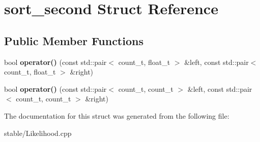 \hypertarget{structsort__second}{\section{sort\-\_\-second Struct Reference}
\label{structsort__second}
}
\subsection*{Public Member Functions}
\begin{DoxyCompactItemize}
\item 
\hypertarget{structsort__second_a09effe9a4855dd805a4b49e3b4f3a1df}{bool {\bfseries operator()} (const std\-::pair$<$ count\-\_\-t, float\-\_\-t $>$ \&left, const std\-::pair$<$ count\-\_\-t, float\-\_\-t $>$ \&right)}\label{structsort__second_a09effe9a4855dd805a4b49e3b4f3a1df}

\item 
\hypertarget{structsort__second_a41cfd4e51b8c799926d881a00a545d35}{bool {\bfseries operator()} (const std\-::pair$<$ count\-\_\-t, count\-\_\-t $>$ \&left, const std\-::pair$<$ count\-\_\-t, count\-\_\-t $>$ \&right)}\label{structsort__second_a41cfd4e51b8c799926d881a00a545d35}

\end{DoxyCompactItemize}


The documentation for this struct was generated from the following file\-:\begin{DoxyCompactItemize}
\item 
stable/Likelihood.\-cpp\end{DoxyCompactItemize}
